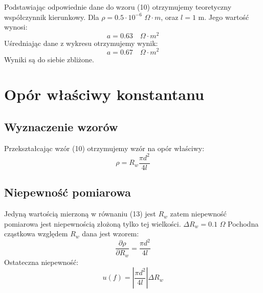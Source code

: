 \documentclass{article} %
\begin{document}
\begin{center}
\end{center}
Podstawiając odpowiednie dane do wzoru (10) otrzymujemy teoretyczny współczynnik kierunkowy. Dla $\rho = 0.5 \cdot10^{-6}$ $\Omega \cdot m$, oraz $l = 1$ m. Jego wartość wynosi:
{\large
\begin{equation}
    a = 0.63 \quad \Omega \cdot m^2
\end{equation}
}
Uśredniając dane z wykresu otrzymujemy wynik:
{\large
\begin{equation}
    a = 0.67 \quad \Omega \cdot m^2
\end{equation}
}
Wyniki są do siebie zbliżone.
\section{Opór właściwy konstantanu}
\subsection{Wyznaczenie wzorów}
Przekształcając wzór (10) otrzymujemy wzór na opór właściwy:
{\large
\begin{equation}
    \rho = R_w\frac{\pi d^2}{4l}
\end{equation}
}
\subsection{Niepewność pomiarowa}
Jedyną wartością mierzoną w równaniu (13) jest $R_w$ zatem niepewność pomiarowa jest niepewnością złożoną tylko tej wielkości. $\Delta R_w = 0.1$ $\Omega$ Pochodna cząstkowa względem $R_w$ dana jest wzorem:
{\large
\begin{equation}
    \frac{\partial \rho}{\partial R_w} = \frac{\pi d^2}{4l}
\end{equation}
}
Ostateczna niepewność:
{\large
\begin{equation}
    u(f) =  |\frac{\pi d^2}{4l}|\Delta R_w
\end{equation}
}
\end{document}
